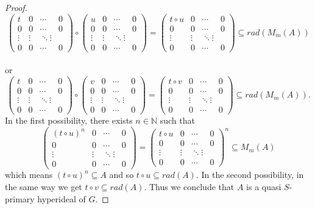 \documentclass[10pt,a4paper]{amsart}
\begin{document}
\begin{proof}
\[ \begin{pmatrix}
t & 0 & \cdots & 0\\
0 & 0 & \cdots & 0\\
\vdots& \vdots & \ddots \vdots\\
0 & 0 & \cdots & 0
\end{pmatrix} 
\circ 
\begin{pmatrix}
u & 0 & \cdots & 0\\
0 & 0 & \cdots & 0\\
\vdots& \vdots & \ddots \vdots\\
0 & 0 & \cdots & 0
\end{pmatrix}
=
\begin{pmatrix}
t \circ u & 0 & \cdots & 0\\
0 & 0 & \cdots & 0\\
\vdots& \vdots & \ddots \vdots\\
0 & 0 & \cdots & 0
\end{pmatrix}
\subseteq rad(M_m(A))\]\\
or 
\[ \begin{pmatrix}
t & 0 & \cdots & 0\\
0 & 0 & \cdots & 0\\
\vdots& \vdots & \ddots \vdots\\
0 & 0 & \cdots & 0
\end{pmatrix} 
\circ 
\begin{pmatrix}
v & 0 & \cdots & 0\\
0 & 0 & \cdots & 0\\
\vdots& \vdots & \ddots \vdots\\
0 & 0 & \cdots & 0
\end{pmatrix}
=
\begin{pmatrix}
t \circ v & 0 & \cdots & 0\\
0 & 0 & \cdots & 0\\
\vdots& \vdots & \ddots \vdots\\
0 & 0 & \cdots & 0
\end{pmatrix}
\subseteq rad(M_m(A)).\] 
In the first possibility, there exists $n \in \mathbb{N}$ such that 
\[\begin{pmatrix}
(t \circ u)^n & 0 & \cdots & 0\\
0 & 0 & \cdots & 0\\
\vdots& \vdots & \ddots \vdots\\
0 & 0 & \cdots & 0
\end{pmatrix}=
\begin{pmatrix}
t \circ u & 0 & \cdots & 0\\
0 & 0 & \cdots & 0\\
\vdots& \vdots & \ddots \vdots\\
0 & 0 & \cdots & 0
\end{pmatrix}^n \subseteq M_m(A)\]
which means $(t \circ  u)^n  \subseteq A$ and so $t \circ  u \subseteq rad(A)$. In the second possibility, in the same way we get  $t \circ  v \subseteq rad(A)$. Thus we conclude that  $A$ is a quasi $S$-primary hyperideal of $G$. 
\end{proof}
\end{document}
